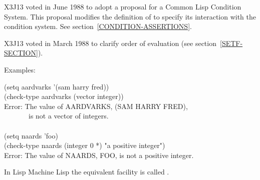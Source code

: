 \begin{defmac}
\begin{new}
X3J13 voted in June 1988
to adopt a proposal for a Common Lisp Condition System. 
This proposal modifies the definition of  to specify its
interaction with the condition system.  See section~\ref{CONDITION-ASSERTIONS}.
\end{new}

\begin{newer}
X3J13 voted in March 1988 
to clarify order of evaluation (see section~\ref{SETF-SECTION}).
\end{newer}

Examples:
\begin{lisp}
(setq aardvarks '(sam harry fred)) \\
(check-type aardvarks (vector integer)) \\
Error: The value of AARDVARKS, (SAM HARRY FRED), \\
~~~~~~~is not a vector of integers. \\
 \\
(setq naards 'foo) \\
(check-type naards (integer 0 *) "a positive integer") \\
Error: The value of NAARDS, FOO, is not a positive integer.
\end{lisp}

\beforenoterule
\begin{incompatibility}
In Lisp Machine Lisp the equivalent facility
is called .
\end{incompatibility}
\afternoterule
\end{defmac}


